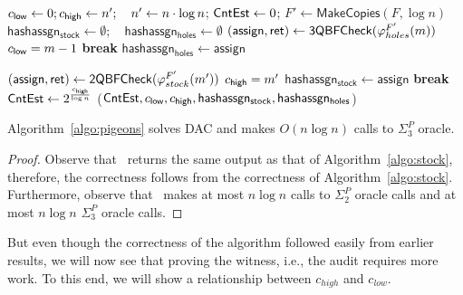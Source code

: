 \begin{algorithm}[h]
	\caption{$\toolname(F)$}
	\label{algo:pigeons}
	
	\begin{algorithmic}[1]
		\State $ c_\mathsf{low}\gets 0 ; c_\mathsf{high} \gets n' ; \quad  n' \gets n \cdot \log n$; $\mathsf{CntEst}\gets 0$;
		\State $F' \gets \mathsf{MakeCopies}(F,\log n)$
		\State $ \mathsf{hashassgn_{stock}} \gets \emptyset; \quad  \mathsf{hashassgn_{holes}} \gets \emptyset$
		\State $(\mathsf{assign},\mathsf{ret}) \gets \mathsf{3QBFCheck}(\varphi^{F'}_{holes}(m))$ \label{line:low-qbf-check}
		\label{line:low-check}
		\State $c_\mathsf{low} = m-1$
		\State \textbf{break}
		\EndIf
		\State $ \mathsf{hashassgn_{holes}} \gets \mathsf{assign}$
		\EndFor 
		
		\State $(\mathsf{assign}, \mathsf{ret}) \gets \mathsf{2QBFCheck} (\varphi^{F'}_{stock}(m'))	$ \label{line:high-qbf-check}
		\label{line:high-check}
		\State $c_\mathsf{high} = m'$
		\State $\mathsf{hashassgn_{stock}} \gets \mathsf{assign}$ 
\State \textbf{break}
\EndIf
\EndFor
\State $\mathsf{CntEst}\gets 2^{\frac{c_\mathsf{high}}{\log n}}$  
		\State \Return ($\mathsf{CntEst}, c_\mathsf{low},c_\mathsf{high},\mathsf{hashassgn_{stock}}, \mathsf{hashassgn_{holes}}$)
	\end{algorithmic}

\end{algorithm}







\begin{theorem}
	Algorithm~\ref{algo:pigeons} solves DAC and makes $O(n \log n)$ calls to $\Sigma_3^P$ oracle.
\end{theorem}
\begin{proof}
Observe that \toolname\ returns the same output as that of Algorithm~\ref{algo:stock}, therefore, the correctness follows from the correctness of Algorithm~\ref{algo:stock}. Furthermore, observe that  \toolname\ makes at most $n\log  n$ calls to $\Sigma_2^P$ oracle calls and at most $n\log n$ $\Sigma_3^P$ oracle calls.


\end{proof}


But even though the correctness of the algorithm followed easily from earlier results, we will now see that proving the witness, i.e., the audit requires more work. To this end, we will show a relationship between $c_{high}$ and $c_{low}$.


